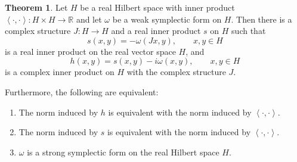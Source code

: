 \documentclass{article}
\newcommand{\inner}[2]{\left\langle #1, #2 \right\rangle}
\theoremstyle{definition}
\newtheorem{theorem}{Theorem}
\theoremstyle{definition}
\begin{document}
\begin{theorem}
Let $H$ be a real Hilbert space with inner product $\inner{\cdot}{\cdot}:H \times H \to \mathbb{R}$
and let $\omega$ be a weak symplectic
form on $H$. Then there is a complex structure $J:H \to H$ and a real inner product
$s$ on $H$ such that
\[
s(x,y) = -\omega(Jx,y), \qquad x,y \in H
\]
is a real inner product on the real vector space $H$, and
\[
h(x,y) = s(x,y) - i\omega(x,y), \qquad x,y \in H
\]
is a complex inner product on $H$ with the complex structure $J$. 

Furthermore, the following are equivalent:
\begin{enumerate}
\item The norm induced by $h$ is equivalent with the norm induced by $\inner{\cdot}{\cdot}$.
\item The norm induced by $s$ is equivalent with the norm induced by $\inner{\cdot}{\cdot}$.
\item $\omega$ is a strong symplectic form on the real Hilbert space $H$.
\end{enumerate}
\end{theorem}
\end{document}
